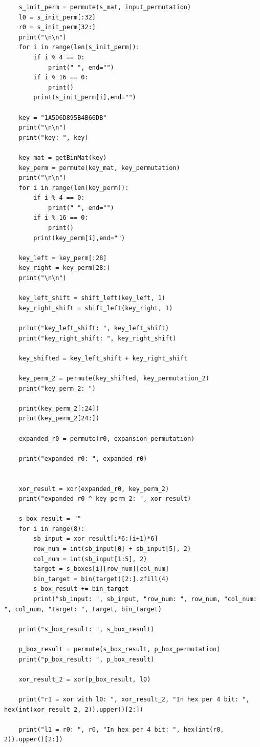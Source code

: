 \documentclass{article}
\begin{document}
\begin{verbatim}
    s_init_perm = permute(s_mat, input_permutation)
    l0 = s_init_perm[:32]
    r0 = s_init_perm[32:]
    print("\n\n")
    for i in range(len(s_init_perm)):
        if i % 4 == 0:
            print(" ", end="")
        if i % 16 == 0:
            print()
        print(s_init_perm[i],end="")
        
    key = "1A5D6D895B4B66DB"
    print("\n\n")
    print("key: ", key)
    
    key_mat = getBinMat(key)
    key_perm = permute(key_mat, key_permutation)
    print("\n\n")
    for i in range(len(key_perm)):
        if i % 4 == 0:
            print(" ", end="")
        if i % 16 == 0:
            print()
        print(key_perm[i],end="")
        
    key_left = key_perm[:28]
    key_right = key_perm[28:]
    print("\n\n")
    
    key_left_shift = shift_left(key_left, 1)
    key_right_shift = shift_left(key_right, 1)
    
    print("key_left_shift: ", key_left_shift)
    print("key_right_shift: ", key_right_shift)
    
    key_shifted = key_left_shift + key_right_shift
    
    key_perm_2 = permute(key_shifted, key_permutation_2)
    print("key_perm_2: ")
    
    print(key_perm_2[:24])
    print(key_perm_2[24:])
    
    expanded_r0 = permute(r0, expansion_permutation)
    
    print("expanded_r0: ", expanded_r0)
    
    
    xor_result = xor(expanded_r0, key_perm_2)
    print("expanded_r0 ^ key_perm_2: ", xor_result)
    
    s_box_result = ""
    for i in range(8):
        sb_input = xor_result[i*6:(i+1)*6]
        row_num = int(sb_input[0] + sb_input[5], 2)
        col_num = int(sb_input[1:5], 2)
        target = s_boxes[i][row_num][col_num]
        bin_target = bin(target)[2:].zfill(4)   
        s_box_result += bin_target
        print("sb_input: ", sb_input, "row_num: ", row_num, "col_num: ", col_num, "target: ", target, bin_target)

    print("s_box_result: ", s_box_result)
    
    p_box_result = permute(s_box_result, p_box_permutation)
    print("p_box_result: ", p_box_result)
    
    xor_result_2 = xor(p_box_result, l0)
    
    print("r1 = xor with l0: ", xor_result_2, "In hex per 4 bit: ", hex(int(xor_result_2, 2)).upper()[2:])

    print("l1 = r0: ", r0, "In hex per 4 bit: ", hex(int(r0, 2)).upper()[2:])
    
        
        
        
\end{verbatim}
\end{document}
